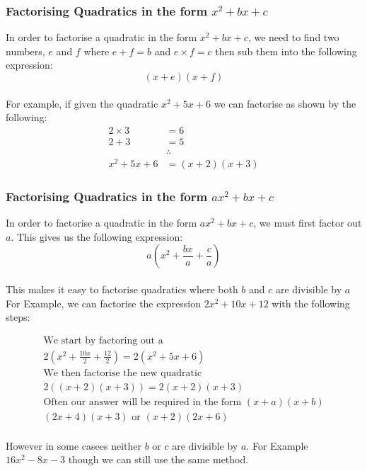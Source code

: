 \documentclass{article}
\begin{document}
\subsubsection{Factorising Quadratics in the form $x^2 + bx + c$}
In order to factorise a quadratic in the form $x^2 + bx + c$,
we need to find two numbers, $e$ and $f$ where $e + f = b$ and
$e \times f = c$ then sub them into the following expression:
\begin{equation}
	(x + e)(x + f)
\end{equation}
\\
For example, if given the quadratic $x^2 + 5x + 6$ we can factorise as shown by the following:
\begin{align*}
	2 \times 3 &= 6 \\
	2 + 3 &= 5 \\
	&\therefore \\
	x^2 + 5x + 6 &= (x + 2)(x + 3)
\end{align*}

\subsubsection{Factorising Quadratics in the form $ax^2 + bx + c$}
In order to factorise a quadratic in the form $ax^2 + bx +c$, we must first factor out $a$.
This gives us the following expression:
\begin{equation}
	a\left(x^2 + \frac{bx}{a} + \frac{c}{a} \right)
\end{equation}
\\
This makes it easy to factorise quadratics where both $b$ and $c$ are divisible by $a$
For Example, we can factorise the expression $2x^2 + 10x + 12$ with the following steps:

\begin{gather*}
	\text{We start by factoring out a}\\
	2\left(x^2 + \frac{10x}{2} + \frac{12}{2} \right) = 2(x^2 + 5x + 6)\\
	\text{We then factorise the new quadratic}\\
	2((x+2)(x+3)) = 2(x+2)(x+3)\\
	\text{Often our answer will be required in the form $(x + a)(x + b)$}\\
	(2x + 4)(x + 3) \text{ or } (x + 2)(2x + 6)
\end{gather*}
\\
However in some casees neither $b$ or $c$ are divisible by $a$.
For Example $16x^2 - 8x - 3$ though we can still use the same method.
\end{document}
